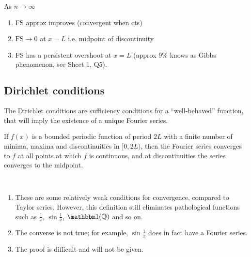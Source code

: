     \begin{note} As $n \to \infty$
        \begin{enumerate}
            \item FS approx improves (convergent when cts)
            \item $\text{FS} \to 0$ at $x = L$ i.e. midpoint of discontinuity
            \item FS has a persistent overshoot at $x = L$ (approx 9\% knows as Gibbs phenomenon, see Sheet 1, Q5).
        \end{enumerate} 
    \end{note} 

    \subsection{Dirichlet conditions}
    The Dirichlet conditions are sufficiency conditions for a ``well-behaved'' function, that will imply the existence of a unique Fourier series.
    \begin{theorem}
        If $f(x)$ is a bounded periodic function of period $2L$ with a finite number of minima, maxima and discontinuities in $[0, 2L)$, then the Fourier series converges to $f$ at all points at which $f$ is continuous, and at discontinuities the series converges to the midpoint.
    \end{theorem}
    \begin{note} \
        \begin{enumerate}
            \item These are some relatively weak conditions for convergence, compared to Taylor series.
                However, this definition still eliminates pathological functions such as $\frac{1}{x}$, $\sin \frac{1}{x}$, $\mathbbm 1 (\mathbb Q)$ and so on.
            \item \color{red}The converse is not true\color{black}; for example, $\sin \frac{1}{x}$ does in fact have a Fourier series.
            \item The proof is difficult and will not be given.
        \end{enumerate}
    \end{note}

